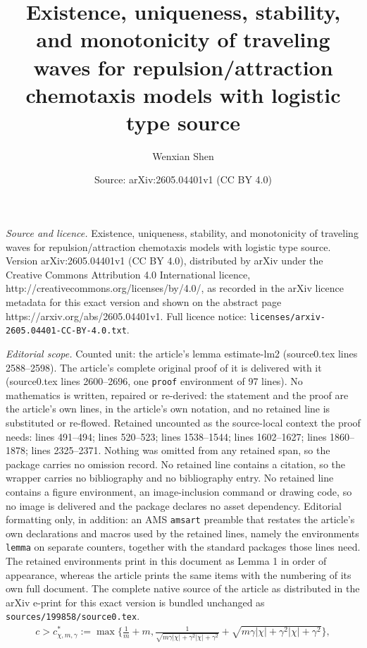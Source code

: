 \documentclass[10pt,a4paper]{amsart}
\title{Existence, uniqueness, stability, and monotonicity of traveling waves for repulsion/attraction chemotaxis models with logistic type source}
\author{Wenxian Shen}
\date{Source: arXiv:2605.04401v1 (CC BY 4.0)}
\begin{document}
\maketitle

\noindent\emph{Source and licence.} Existence, uniqueness, stability, and monotonicity of traveling waves for repulsion/attraction chemotaxis models with logistic type source. Version arXiv:2605.04401v1 (CC BY 4.0), distributed by arXiv under the Creative Commons Attribution 4.0 International licence, http://creativecommons.org/licenses/by/4.0/, as recorded in the arXiv licence metadata for this exact version and shown on the abstract page https://arxiv.org/abs/2605.04401v1. Full licence notice: \texttt{licenses/arxiv-2605.04401-CC-BY-4.0.txt}.\par\smallskip

\noindent\textit{Editorial scope.} Counted unit: the article's lemma estimate-lm2 (source0.tex lines 2588--2598). The article's complete original proof of it is delivered with it (source0.tex lines 2600--2696, one \texttt{proof} environment of 97 lines). No mathematics is written, repaired or re-derived: the statement and the proof are the article's own lines, in the article's own notation, and no retained line is substituted or re-flowed.  Retained uncounted as the source-local context the proof needs: lines 491--494; lines 520--523; lines 1538--1544; lines 1602--1627; lines 1860--1878; lines 2325--2371.  Nothing was omitted from any retained span, so the package carries no omission record.  No retained line contains a citation, so the wrapper carries no bibliography and no bibliography entry.  No retained line contains a figure environment, an image-inclusion command or drawing code, so no image is delivered and the package declares no asset dependency.  Editorial formatting only, in addition: an AMS \texttt{amsart} preamble that restates the article's own declarations and macros used by the retained lines, namely the environments \texttt{lemma} on separate counters, together with the standard packages those lines need.  The retained environments print in this document as Lemma 1 in order of appearance, whereas the article prints the same items with the numbering of its own full document.  The complete native source of the article as distributed in the arXiv e-print for this exact version is bundled unchanged as \texttt{sources/199858/source0.tex}.
\begin{align}
\label{cond-on-c-eq1}
c>c^*_{\chi,m,\gamma}:=\max\Big\{ \frac{1}{m}+m, \frac{1}{\sqrt{m\gamma |\chi|+\gamma^2 |\chi|+\gamma^2}} + \sqrt {m\gamma |\chi| +\gamma^2 |\chi|+\gamma^2}\Big\},
\end{align}
\end{document}
